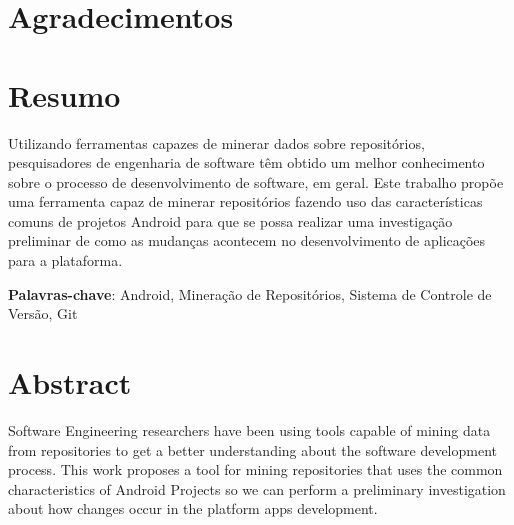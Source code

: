 \documentclass[a4paper,12pt]{article}
\begin{document}
\newpage
\section*{Agradecimentos}


\newpage
{} %
\section*{Resumo}
Utilizando ferramentas capazes de minerar dados sobre repositórios, pesquisadores de engenharia de software têm obtido um melhor conhecimento sobre o processo de desenvolvimento de software, em geral. Este trabalho propõe uma ferramenta capaz de minerar repositórios fazendo uso das características comuns de projetos Android para que se possa realizar uma investigação preliminar de como as mudanças acontecem no desenvolvimento de aplicações para a plataforma.

\textbf{Palavras-chave}: Android, Mineração de Repositórios, Sistema de Controle de Versão, Git

\newpage
\section*{Abstract}

Software Engineering researchers have been using tools capable of mining data from repositories to get a better understanding about the software development process. This work proposes a tool for mining repositories that uses the common characteristics of Android Projects so we can perform a preliminary investigation about how changes occur in the platform apps development.
\end{document}
